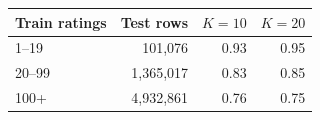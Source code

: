 \begin{tabular*}{\linewidth}{@{\extracolsep{\fill}}lrrr}
\toprule
Train ratings & Test rows & $K=10$ & $K=20$ \\
\midrule
1--19 & 101,076 & 0.93 & 0.95 \\
20--99 & 1,365,017 & 0.83 & 0.85 \\
100+ & 4,932,861 & 0.76 & 0.75 \\
\bottomrule
\end{tabular*}
